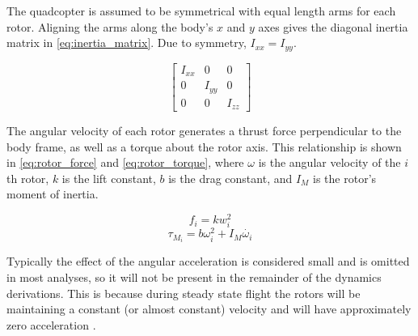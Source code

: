 \documentclass[letterpaper,12pt,titlepage,oneside,final]{book}
\begin{document}

The quadcopter is assumed to be symmetrical with equal length arms for each rotor. 
Aligning the arms along the body's $x$ and $y$ axes gives the diagonal inertia matrix in \eqref{eq:inertia_matrix}. 
Due to symmetry, $I_{xx} = I_{yy}$.

\begin{equation} \label{eq:inertia_matrix}
\begin{bmatrix}
I_{xx} & 0 & 0 \\
0 & I_{yy} & 0 \\
0 & 0 & I_{zz}
\end{bmatrix}
\end{equation}

The angular velocity of each rotor generates a thrust force perpendicular to the body frame, as well as a torque about the rotor axis. 
This relationship is shown in \eqref{eq:rotor_force} and \eqref{eq:rotor_torque}, 
where $\omega$ is the angular velocity of the $i$th rotor, $k$ is the lift constant, $b$ is the drag constant, and $I_{M}$ is the rotor's moment of inertia.

\begin{equation} \label{eq:rotor_force}
f_{i} = kw_{i}^{2}
\end{equation}
\begin{equation} \label{eq:rotor_torque}
\tau_{M_{i}} = b\omega_{i}^{2} + I_{M}\dot{\omega_{i}}
\end{equation}

Typically the effect of the angular acceleration is considered small and is omitted in most analyses, so it will not be present in the remainder of the dynamics derivations. This is because during steady state flight the rotors will be maintaining a constant (or almost constant) velocity and will have approximately zero acceleration \cite{gibiansky}.
\end{document}
